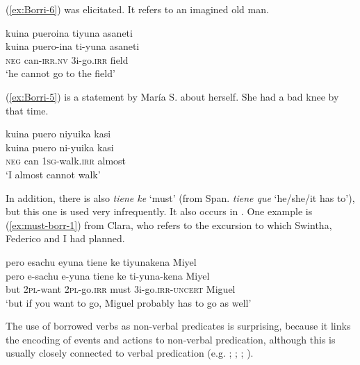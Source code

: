 (\ref{ex:Borri-6}) was elicitated. It refers to an imagined old man.

\ea\label{ex:Borri-6}
\begingl
\glpreamble kuina pueroina tiyuna asaneti\\
\gla kuina puero-ina ti-yuna asaneti\\
\glb \textsc{neg} can-\textsc{irr.nv} 3i-go.\textsc{irr} field\\
\glft ‘he cannot go to the field’
\endgl
\trailingcitation{[rxx-e181022le]}
\xe

(\ref{ex:Borri-5}) is a statement by María S. about herself. She had a bad knee by that time.

\ea\label{ex:Borri-5}
\begingl
\glpreamble kuina puero niyuika kasi\\
\gla kuina puero ni-yuika kasi\\
\glb \textsc{neg} can 1\textsc{sg}-walk.\textsc{irr} almost\\
\glft ‘I almost cannot walk’
\endgl
\trailingcitation{[rxx-e181017l.011]}
\xe
{}

In addition, there is also \textit{tiene ke} ‘must’ (from Span. \textit{tiene que} ‘he/she/it has to’), but this one is used very infrequently. It also occurs in  \citep[cf. Bésiro text examples in][47--70]{Sans2013}. One example is (\ref{ex:must-borr-1}) from Clara, who refers to the excursion to  which Swintha, Federico and I had planned.

\ea\label{ex:must-borr-1}
\begingl
\glpreamble pero esachu eyuna tiene ke tiyunakena Miyel\\
\gla pero e-sachu e-yuna {tiene ke} ti-yuna-kena Miyel\\
\glb but 2\textsc{pl}-want 2\textsc{pl}-go.\textsc{irr} must 3i-go.\textsc{irr}-\textsc{uncert} Miguel\\
\glft ‘but if you want to go, Miguel probably has to go as well’
\endgl
\trailingcitation{[cux-c120414ls-1.139]}
\xe
{}

The use of borrowed verbs as non-verbal predicates is surprising, because it links the encoding of events and actions to non-verbal predication, although this is usually closely connected to verbal predication (e.g. \citealt[189, 244]{Langacker1987}; \citealt[140, 142]{Frawley1992}; \citealt[82--83]{VanValinLaPolla1997}; \citealt[52]{Givon2001}).

